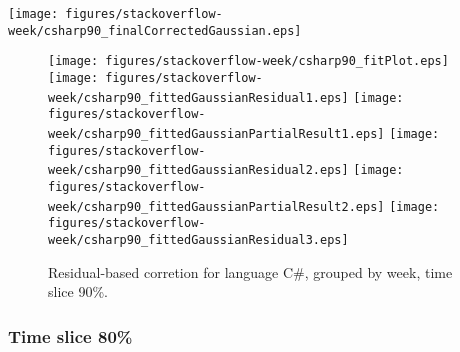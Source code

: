 \begin{center}
{\texttt{[image: figures/stackoverflow-week/csharp90\_finalCorrectedGaussian.eps]}}
\end{center}

\FloatBarrier

\begin{figure}[t]
\centering
{}
{\texttt{[image: figures/stackoverflow-week/csharp90\_fitPlot.eps]}}
{\texttt{[image: figures/stackoverflow-week/csharp90\_fittedGaussianResidual1.eps]}}
{\texttt{[image: figures/stackoverflow-week/csharp90\_fittedGaussianPartialResult1.eps]}}
{\texttt{[image: figures/stackoverflow-week/csharp90\_fittedGaussianResidual2.eps]}}
{\texttt{[image: figures/stackoverflow-week/csharp90\_fittedGaussianPartialResult2.eps]}}
{\texttt{[image: figures/stackoverflow-week/csharp90\_fittedGaussianResidual3.eps]}}
\caption{Residual-based corretion for language C\#, grouped by week, time slice 90\%.}
\end{figure}


\FloatBarrier


\subsubsection{Time slice 80\%}

